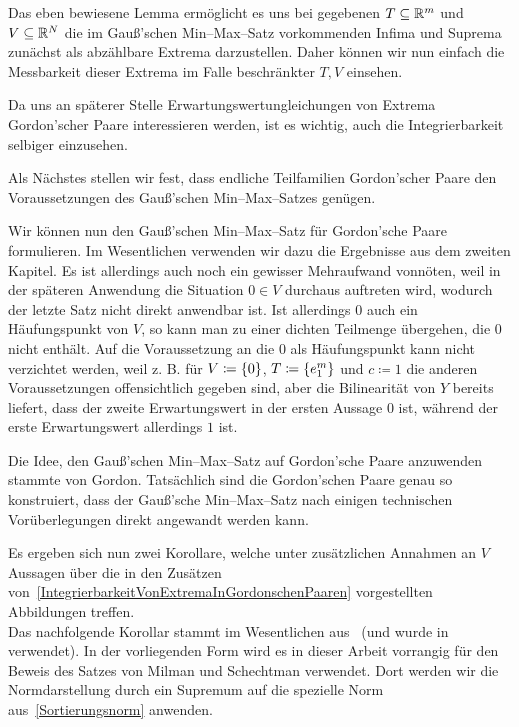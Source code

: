 \documentclass[a4paper]{report}
\numberwithin[\roman]{equation}{sat}
\begin{document}

\parag
Das eben bewiesene Lemma ermöglicht es uns bei gegebenen $T\subseteq \mathbb{R}^m$
und $V \subseteq \mathbb{R}^N$ die im Gauß'schen Min--Max--Satz vorkommenden
Infima und Suprema zunächst als abzählbare Extrema darzustellen.
Daher können wir nun einfach die Messbarkeit dieser Extrema im Falle beschränkter
$T,V$ einsehen.


\parag
Da uns an späterer Stelle Erwartungswertungleichungen von Extrema Gordon'scher
Paare interessieren werden, ist es wichtig, auch die Integrierbarkeit selbiger
einzusehen.


\parag
Als Nächstes stellen wir fest, dass endliche Teilfamilien Gordon'scher Paare
den Voraussetzungen des Gauß'schen Min--Max--Satzes genügen.


\parag
Wir können nun den Gauß'schen Min--Max--Satz für Gordon'sche Paare formulieren.
Im Wesentlichen verwenden wir dazu die Ergebnisse aus dem zweiten Kapitel.
Es ist allerdings auch noch ein gewisser Mehraufwand vonnöten, weil in der
späteren Anwendung die Situation $0 \in V$ durchaus auftreten wird, wodurch
der letzte Satz nicht direkt anwendbar ist.
Ist allerdings $0$ auch ein
Häufungspunkt von $V$, so kann man zu einer dichten Teilmenge übergehen, die
$0$ nicht enthält.
Auf die Voraussetzung an die $0$ als Häufungspunkt kann
nicht verzichtet werden, weil z. B. für $V \coloneqq  \left\{0\right\}$, $T\coloneqq \left\{e_1^m\right\}$ und
$c \coloneqq  1$ die anderen Voraussetzungen offensichtlich gegeben sind, aber
die Bilinearität von $Y$ bereits liefert, dass der zweite Erwartungswert in
der ersten Aussage $0$ ist, während der erste Erwartungswert allerdings $1$
ist.


\parag
Die Idee, den Gauß'schen Min--Max--Satz auf Gordon'sche Paare anzuwenden
stammte von Gordon.
Tatsächlich sind die Gordon'schen Paare genau so
konstruiert, dass der Gauß'sche Min--Max--Satz nach einigen technischen
Vorüberlegungen direkt angewandt werden kann.

Es ergeben sich nun zwei Korollare, welche unter zusätzlichen Annahmen an $V$
Aussagen über die in den Zusätzen von~\ref{IntegrierbarkeitVonExtremaInGordonschenPaaren} vorgestellten Abbildungen
treffen.\\
Das nachfolgende Korollar stammt im Wesentlichen aus~\cite{Gor}
(und wurde in~\cite{Gor2} verwendet).
In der vorliegenden Form wird es in
dieser Arbeit vorrangig für den Beweis des Satzes von Milman und Schechtman
verwendet.
Dort werden wir die Normdarstellung durch ein Supremum auf die
spezielle Norm aus~\ref{Sortierungsnorm} anwenden.
\end{document}
